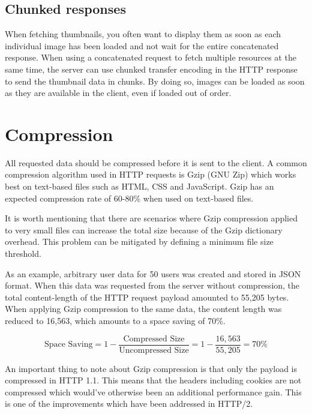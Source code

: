 \documentclass{cslthse-msc}
\begin{document}
\subsection{Chunked responses}
When fetching thumbnails, you often want to display them as soon as each individual image has been loaded and not wait for the entire concatenated response. When using a concatenated request to fetch multiple resources at the same time, the server can use chunked transfer encoding in the HTTP response to send the thumbnail data in chunks\cite{chunked}. By doing so, images can be loaded as soon as they are available in the client, even if loaded out of order\cite{dropbox_chunked}.

\section{Compression}
\label{compression}

All requested data should be compressed before it is sent to the client. A common compression algorithm used in HTTP requests is Gzip (GNU Zip) which works best on text-based files such as HTML, CSS and JavaScript. Gzip has an expected compression rate of 60-80\% when used on text-based files\cite[page 237]{HPBN}.

It is worth mentioning that there are scenarios where Gzip compression applied to very small files can increase the total size because of the Gzip dictionary overhead. This problem can be mitigated by defining a minimum file size threshold\cite{google_gzip}.

As an example, arbitrary user data for 50 users was created and stored in JSON format. When this data was requested from the server without compression, the total content-length of the HTTP request payload amounted to 55,205 bytes. When applying Gzip compression to the same data, the content length was reduced to 16,563, which amounts to a space saving of 70\%. 

\begin{equation}
\mbox{Space Saving} = 1 - \frac{\mbox{Compressed Size}}{\mbox{Uncompressed Size}} = 1 - \frac{16,563}{55,205} = 70\%
\end{equation}

An important thing to note about Gzip compression is that only the payload is compressed in HTTP 1.1\cite{header_compression}. This means that the headers including cookies are not compressed which would've otherwise been an additional performance gain. This is one of the improvements which have been addressed in HTTP/2\cite[page 222]{HPBN}.
\end{document}
